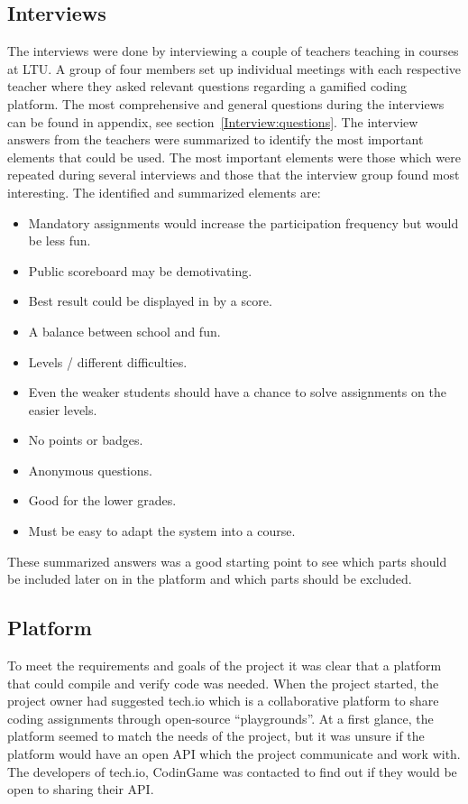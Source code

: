 \documentclass[a4paper,12pt]{article}
\begin{document}
\subsection{Interviews}
The interviews were done by interviewing a couple of teachers teaching in courses at LTU. A group of four members set up individual meetings with each respective teacher where they asked relevant questions regarding a gamified coding platform. The most comprehensive and general questions during the interviews can be found in appendix, see section~\ref{Interview:questions}. The interview answers from the teachers were summarized to identify the most important elements that could be used. The most important elements were those which were repeated during several interviews and those that the interview group found most interesting. The identified and summarized elements are:

 \begin{itemize}
 \item Mandatory assignments would increase the participation frequency but would be less fun.
 \item Public scoreboard may be demotivating.
 \item Best result could be displayed in by a score.
 \item A balance between school and fun.
 \item Levels / different difficulties. 
 \item Even the weaker students should have a chance to solve assignments on the easier levels.
 \item No points or badges.
 \item Anonymous questions.
 \item Good for the lower grades.
 \item Must be easy to adapt the system into a course.
 \end{itemize}
These summarized answers was a good starting point to see which parts should be included later on in the platform and which parts should be excluded. 

\subsection{Platform}   
To meet the requirements and goals of the project it was clear that a platform that could compile and verify code was needed.
When the project started, the project owner had suggested tech.io which is a collaborative platform to share coding assignments through open-source ``playgrounds''. At a first glance, the platform seemed to match the needs of the project, but it was unsure if the platform would have an open API which the project communicate and work with. The developers of tech.io, CodinGame was contacted to find out if they would be open to sharing their API.
\end{document}

